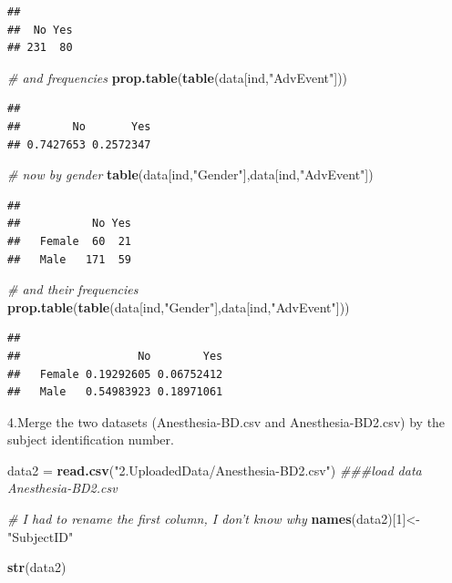 \documentclass[]{book}
\newenvironment{Shaded}{\begin{snugshade}}{\end{snugshade}}
\newcommand{\CommentTok}[1]{\textcolor[rgb]{0.56,0.35,0.01}{\textit{#1}}}
\newcommand{\DecValTok}[1]{\textcolor[rgb]{0.00,0.00,0.81}{#1}}
\newcommand{\KeywordTok}[1]{\textcolor[rgb]{0.13,0.29,0.53}{\textbf{#1}}}
\newcommand{\NormalTok}[1]{#1}
\newcommand{\StringTok}[1]{\textcolor[rgb]{0.31,0.60,0.02}{#1}}
\begin{document}
\begin{verbatim}
## 
##  No Yes 
## 231  80
\end{verbatim}

\begin{Shaded}
\begin{Highlighting}[]
\CommentTok{# and frequencies}
\KeywordTok{prop.table}\NormalTok{(}\KeywordTok{table}\NormalTok{(data[ind,}\StringTok{"AdvEvent"}\NormalTok{]))}
\end{Highlighting}
\end{Shaded}

\begin{verbatim}
## 
##        No       Yes 
## 0.7427653 0.2572347
\end{verbatim}

\begin{Shaded}
\begin{Highlighting}[]
\CommentTok{# now by gender}
\KeywordTok{table}\NormalTok{(data[ind,}\StringTok{"Gender"}\NormalTok{],data[ind,}\StringTok{"AdvEvent"}\NormalTok{])}
\end{Highlighting}
\end{Shaded}

\begin{verbatim}
##         
##           No Yes
##   Female  60  21
##   Male   171  59
\end{verbatim}

\begin{Shaded}
\begin{Highlighting}[]
\CommentTok{# and their frequencies}
\KeywordTok{prop.table}\NormalTok{(}\KeywordTok{table}\NormalTok{(data[ind,}\StringTok{"Gender"}\NormalTok{],data[ind,}\StringTok{"AdvEvent"}\NormalTok{]))}
\end{Highlighting}
\end{Shaded}

\begin{verbatim}
##         
##                  No        Yes
##   Female 0.19292605 0.06752412
##   Male   0.54983923 0.18971061
\end{verbatim}

4.Merge the two datasets (Anesthesia-BD.csv and Anesthesia-BD2.csv)
by the subject identification number.

\begin{Shaded}
\begin{Highlighting}[]
\NormalTok{data2 =}\StringTok{ }\KeywordTok{read.csv}\NormalTok{(}\StringTok{"2.UploadedData/Anesthesia-BD2.csv"}\NormalTok{) }\CommentTok{###load data Anesthesia-BD2.csv}

\CommentTok{# I had to rename the first column, I don't know why}
\KeywordTok{names}\NormalTok{(data2)[}\DecValTok{1}\NormalTok{]<-}\StringTok{"SubjectID"}

\KeywordTok{str}\NormalTok{(data2)}
\end{Highlighting}
\end{Shaded}
\end{document}
